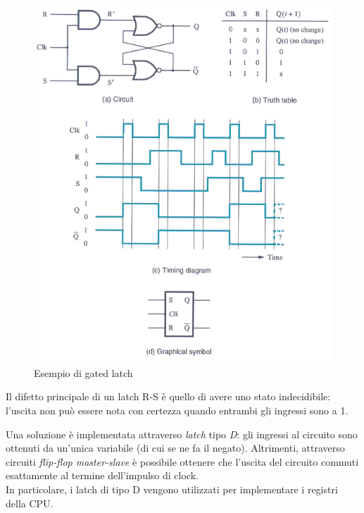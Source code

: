 \documentclass[class=book, crop=false]{standalone}
\begin{document}
\begin{figure}[H]
	\centering
	\includegraphics[width=\textwidth,keepaspectratio]{gated_latch.png}
	\caption{Esempio di gated latch}
\end{figure}
Il difetto principale di un latch R-S è quello di avere uno stato indecidibile: l'uscita non può essere nota con certezza quando entrambi gli ingressi sono a 1.

Una soluzione è implementata attraverso \emph{latch} tipo \emph{D}: gli ingressi al circuito sono ottenuti da un'unica variabile (di cui se ne fa il negato). Altrimenti, attraverso circuiti \emph{flip-flop master-slave} è possibile ottenere che l’uscita del circuito commuti esattamente al termine dell’impulso di clock.\\
In particolare, i latch di tipo D vengono utilizzati per implementare i registri della CPU.
\end{document}
